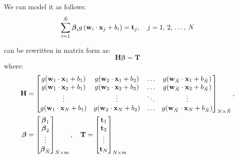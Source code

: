 We can model it as follows:
\begin{equation}%
    \label{eq:slfn}
    \sum_{i=1}^{\tilde{N}} \boldsymbol\beta_{i} g\left( \textbf w_i \cdot \textbf x_j + b_i \right) = \textbf t_j, \quad j = 1,\,2,\,\dots,\,N
\end{equation}

 can be rewritten in matrix form as:
\begin{equation}
    \textbf{H}\boldsymbol\beta = \textbf{T}
\end{equation}
where:
\begin{align}
    \textbf H        & = \begin{bmatrix}
                             g(\textbf w_1 \cdot \textbf x_1 + b_1) & g(\textbf w_2 \cdot \textbf x_1 + b_2) & \dots  & g(\textbf w_{\tilde{N}} \cdot \textbf x_1 + b_{\tilde{N}}) \\
                             g(\textbf w_1 \cdot \textbf x_2 + b_1) & g(\textbf w_2 \cdot \textbf x_2 + b_2) & \dots  & g(\textbf w_{\tilde{N}} \cdot \textbf x_2 + b_{\tilde{N}}) \\
                             \vdots                                 & \vdots                                 & \ddots & \vdots                                                     \\
                             g(\textbf w_1 \cdot \textbf x_N + b_1) & g(\textbf w_2 \cdot \textbf x_N + b_2) & \dots  & g(\textbf w_{\tilde{N}} \cdot \textbf x_N + b_{\tilde{N}})
                         \end{bmatrix}_{N \times \tilde{N}}, \\
    \boldsymbol\beta & = \begin{bmatrix}
                             \boldsymbol\beta_1 \\
                             \boldsymbol\beta_2 \\
                             \vdots             \\
                             \boldsymbol\beta_{\tilde{N}}
                         \end{bmatrix}_{\tilde{N} \times m}, \quad
    \textbf T = \begin{bmatrix}
                    \textbf t_1 \\
                    \textbf t_2 \\
                    \vdots      \\
                    \textbf t_N
                \end{bmatrix}_{N \times m}
\end{align}

